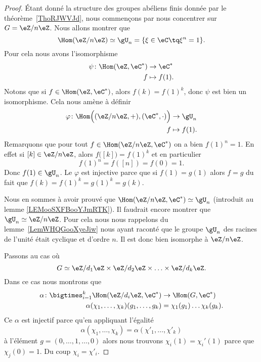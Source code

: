 \begin{proof}
	Étant donné la structure des groupes abéliens finis donnée par le théorème~\ref{ThoRJWVJd}, nous commençons par nous concentrer sur \( G=\eZ/n\eZ\). Nous allons montrer que
	\begin{equation}
		\Hom(\eZ/n\eZ)\simeq \gU_n=\{ \xi\in \eC\tq \xi^n=1 \}.
	\end{equation}
	Pour cela nous avons l'isomorphisme
	\begin{equation}
		\begin{aligned}
			\psi\colon \Hom(\eZ,\eC^*) & \to \eC^*     \\
			f                          & \mapsto f(1).
		\end{aligned}
	\end{equation}
	Notons que si \( f\in \Hom(\eZ,\eC^*)\), alors \( f(k)=f(1)^k\), donc \( \psi\) est bien un isomorphisme. Cela nous amène à définir
	\begin{equation}
		\begin{aligned}
			\varphi\colon \Hom\Big( (\eZ/n\eZ,+),(\eC^*,\cdot) \Big) & \to \gU_n     \\
			f                                                        & \mapsto f(1).
		\end{aligned}
	\end{equation}
	Remarquons que pour tout \( f\in\Hom(\eZ/n\eZ,\eC^*)\) on a bien \( f(1)^n=1\). En effet si \( [k]\in \eZ/n\eZ\), alors \( f\big( [k] \big)=f(1)^k\) et en particulier
	\begin{equation}
		f(1)^n=f([n])=f(0)=1.
	\end{equation}
	Donc \( f(1)\in \gU_n\). Le \( \varphi\) est injective parce que si \( f(1)=g(1)\) alors \( f=g\) du fait que \( f(k)=f(1)^k=g(1)^k=g(k)\).

	Nous en sommes à avoir prouvé que \( \Hom(\eZ/n\eZ,\eC^*)\simeq \gU_n\) (introduit au lemme \ref{LEMooSXFBooYJmRTK}). Il faudrait encore montrer que \( \gU_n\simeq \eZ/n\eZ\). Pour cela nous nous rappelons du lemme~\ref{LemWHQGooXyeJiw} nous ayant raconté que le groupe \( \gU_n\) des racines de l'unité était cyclique et d'ordre \( n\). Il est donc bien isomorphe à \( \eZ/n\eZ\).

	Passons au cas où
	\begin{equation}
		G\simeq \eZ/d_1\eZ\times \eZ/d_2\eZ\times \ldots\times \eZ/d_k\eZ.
	\end{equation}
	Dans ce cas nous montrons que
	\begin{equation}
		\begin{aligned}
			\alpha\colon \bigtimes_{i=1}^k\Hom(\eZ/d_i\eZ,\eC^*) & \to \Hom(G,\eC^*)               \\
			\alpha(\chi_1,\ldots, \chi_k)(g_1,\ldots, g_k)       & = \chi_1(g_1)\ldots\chi_k(g_k).
		\end{aligned}
	\end{equation}
	Ce \( \alpha\) est injectif parce qu'en appliquant l'égalité
	\begin{equation}
		\alpha(\chi_1,\ldots, \chi_k)=\alpha(\chi'_1,\ldots, \chi'_k)
	\end{equation}
	à l'élément \( g=(0,\ldots, 1,\ldots, 0)\) alors nous trouvons \( \chi_i(1)=\chi_i'(1)\) parce que \( \chi_j(0)=1\). Du coup \( \chi_i=\chi'_i\).


\end{proof}
